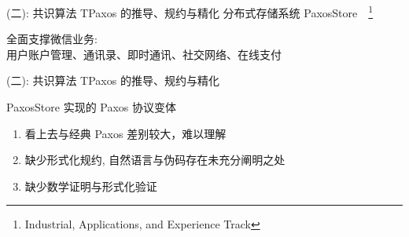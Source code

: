 
\begin{frame}{(二): 共识算法 TPaxos 的推导、规约与精化}
  \setcounter{footnote}{0} 
  {\small 分布式存储系统 PaxosStore~{~\footnote{Industrial, Applications, and Experience Track}}}

  \vspace{-0.50cm}
  \begin{center}
    全面支撑微信业务: \\[5pt]
    用户账户管理、通讯录、即时通讯、社交网络、在线支付 \\[15pt]
  \end{center}
\end{frame}

\setcounter{footnote}{0} 
\begin{frame}{(二): 共识算法 TPaxos 的推导、规约与精化}
  \begin{center}
     PaxosStore 实现的 Paxos 协议变体
  \end{center}

  \begin{enumerate}
    \setlength{\itemsep}{5pt}
    \item 看上去与经典 Paxos 差别较大，难以理解
    \item 缺少形式化规约, 自然语言与伪码存在未充分阐明之处
    \item 缺少数学证明与形式化验证
  \end{enumerate}

  \begin{center}
  \end{center}
\end{frame}

